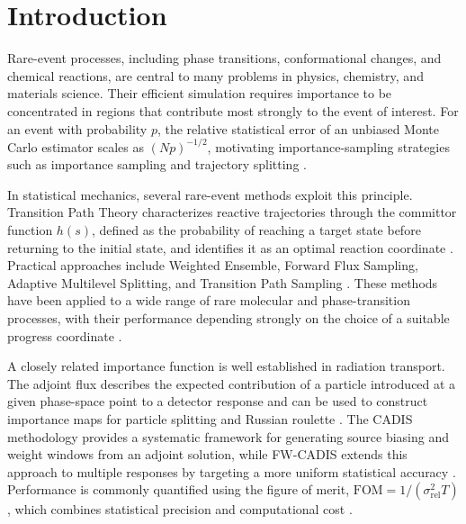 \documentclass[a4paper,fleqn]{cas-sc}
\begin{document}
\maketitle

\section{Introduction}\label{sec:intro}

Rare-event processes, including phase transitions, conformational changes, and chemical reactions, are central to many problems in physics, chemistry, and materials science. Their efficient simulation requires importance to be concentrated in regions that contribute most strongly to the event of interest. For an event with probability $p$, the relative statistical error of an unbiased Monte Carlo estimator scales as $(Np)^{-1/2}$, motivating importance-sampling strategies such as importance sampling and trajectory splitting \cite{kahn1951,kahn1953,allen2009,touchette2009}.

In statistical mechanics, several rare-event methods exploit this principle. Transition Path Theory characterizes reactive trajectories through the committor function $h(s)$, defined as the probability of reaching a target state before returning to the initial state, and identifies it as an optimal reaction coordinate \cite{e2006,metzner2009,evanden2010}. Practical approaches include Weighted Ensemble, Forward Flux Sampling, Adaptive Multilevel Splitting, and Transition Path Sampling \cite{huber1996,zhang2010,allen2009,cerou2007,bolhuis2002}. These methods have been applied to a wide range of rare molecular and phase-transition processes, with their performance depending strongly on the choice of a suitable progress coordinate \cite{allen2009,zuckerman2017}.

A closely related importance function is well established in radiation transport. The adjoint flux describes the expected contribution of a particle introduced at a given phase-space point to a detector response and can be used to construct importance maps for particle splitting and Russian roulette \cite{lewins1965,bell1970,booth1984}. The CADIS methodology provides a systematic framework for generating source biasing and weight windows from an adjoint solution, while FW-CADIS extends this approach to multiple responses by targeting a more uniform statistical accuracy \cite{wagner1998,haghighat2003,wagnerfw2014,cooper2001}. Performance is commonly quantified using the figure of merit,
$\mathrm{FOM}=1/(\sigma_{\mathrm{rel}}^{2}T)$, which combines statistical precision and computational cost \cite{spanier1969,wagnerfw2014}.
\end{document}
